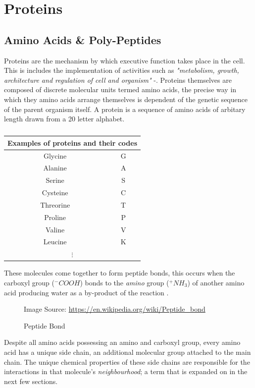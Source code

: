 \section{Proteins}
\subsection{Amino Acids \& Poly-Peptides}
Proteins are the mechanism by which
executive function takes place in the cell. 
This is includes the implementation
of activities such as \emph{"metabolism, growth,
architecture and regulation of cell and organism"} -\cite{lesk}.
Proteins themselves are composed
of discrete molecular units termed amino acids, the precise
way in which they amino acids arrange themselves is dependent
of the genetic sequence of the parent organism itself.
A protein is a sequence of amino acids of arbitary length drawn from a 20 letter alphabet.
\begin{table}
    \begin{center}
        \caption{}
\begin{tabular}{||c | c||}
    \hline
    \multicolumn{2}{||c||}{Examples of proteins and their codes}\\
    \hline\hline
    Glycine & G  \\ 
    \hline
    Alanine & A \\
    \hline
    Serine & S  \\
    \hline
    Cysteine & C  \\
    \hline
    Threorine & T \\ 
    \hline
    Proline & P \\
    \hline
    Valine &  V\\
    \hline
    Leucine & K \\ 
    \hline
    \multicolumn{2}{||c||}{$\vdots$} \\ 
    \hline
\end{tabular}
\end{center}
\end{table}
These molecules come together to form peptide bonds,
this occurs when the carboxyl group ($^-COOH$) bonds to the
\emph{amino} group ($^+NH_3$) of another amino acid producing 
water as a by-product of the reaction \cite{lesk}.
\begin{figure}
    \caption{Peptide Bond}
     
    \scriptsize{\dag Image Source: \url{https://en.wikipedia.org/wiki/Peptide_bond}}
\end{figure}
Despite all amino acids possessing an amino and
carboxyl group, every amino acid has a unique side chain,
an additional molecular group attached to the main chain.
The unique chemical properties of these side chains are responsible
for the interactions in that molecule's \emph{neighbourhood};
a term that is expanded on in the next few sections.


